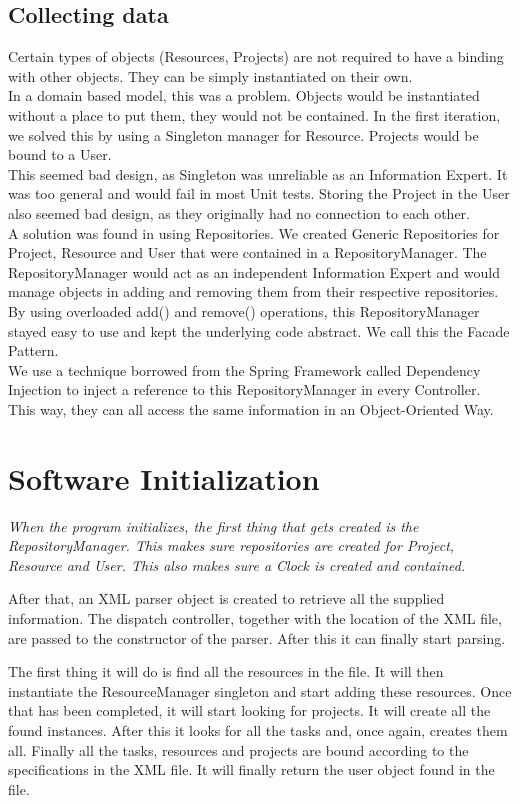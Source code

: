 		\subsection{Collecting data}
		Certain types of objects (Resources, Projects) are not required to have a binding with other objects. They can be simply instantiated on their own.\\
		In a domain based model, this was a problem. Objects would be instantiated without a place to put them, they would not be contained. In the first iteration, we solved this by using a Singleton manager for Resource. Projects would be bound to a User.\\
		This seemed bad design, as Singleton was unreliable as an Information Expert. It was too general and would fail in most Unit tests. Storing the Project in the User also seemed bad design, as they originally had no connection to each other.\\
		A solution was found in using Repositories. We created Generic Repositories for Project, Resource and User that were contained in a RepositoryManager. The RepositoryManager would act as an independent Information Expert and would manage objects in adding and removing them from their respective repositories.\\
		By using overloaded add() and remove() operations, this RepositoryManager stayed easy to use and kept the underlying code abstract. We call this the Facade Pattern.\\
		We use a technique borrowed from the Spring Framework called Dependency Injection to inject a reference to this RepositoryManager in every Controller. This way, they can all access the same information in an Object-Oriented Way.
		
	\section{Software Initialization}
	\emph{When the program initializes, the first thing that gets created is the RepositoryManager. This makes sure repositories are created for Project, Resource and User. This also makes sure a Clock is created and contained.}
	
	After that, an XML parser object is created to retrieve all the supplied information. The dispatch controller, together with the location of the XML file, are passed to the constructor of the parser. After this it can finally start parsing.
	
	The first thing it will do is find all the resources in the file. It will then instantiate the ResourceManager singleton and start adding these resources. Once that has been completed, it will start looking for projects. It will create all the found instances. After this it looks for all the tasks and, once again, creates them all. Finally all the tasks, resources and projects are bound according to the specifications in the XML file. It will finally return the user object found in the file.
	
